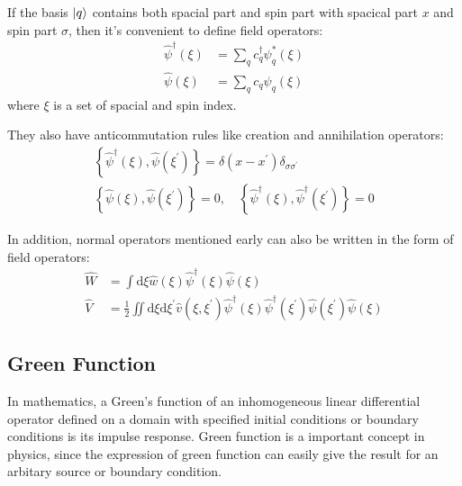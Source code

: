 If the basis $\ket{q}$ contains both spacial part and spin part with spacical part $x$ and spin part $\sigma$, then it's convenient to define field operators:
\begin{equation}
\begin{aligned} \hat{\psi}^{\dagger}(\xi) &=\sum_{q} c_{q}^{\dagger} \psi_{q}^{*}(\xi) \\ \hat{\psi}(\xi) &=\sum_{q} c_{q} \psi_{q}(\xi) \end{aligned}
\end{equation}
where $\xi$ is a set of spacial and spin index.

They also have anticommutation rules like creation and annihilation operators:
\begin{equation}
\begin{array}{c}{\left\{\hat{\psi}^{\dagger}(\xi), \hat{\psi}\left(\xi^{\prime}\right)\right\}=\delta\left(x-x^{\prime}\right) \delta_{\sigma \sigma^{\prime}}} \\ {\left\{\hat{\psi}(\xi), \hat{\psi}\left(\xi^{\prime}\right)\right\}=0, \quad\left\{\hat{\psi}^{\dagger}(\xi), \hat{\psi}^{\dagger}\left(\xi^{\prime}\right)\right\}=0}\end{array}
\end{equation}

In addition, normal operators mentioned early can also be written in the form of field operators:
\begin{equation}
\begin{aligned} \hat{W} &=\int \mathrm{d} \xi \hat{w}(\xi) \hat{\psi}^{\dagger}(\xi) \hat{\psi}(\xi) \\ \hat{V} &=\frac{1}{2} \iint \mathrm{d} \xi \mathrm{d} \xi^{\prime} \hat{v}\left(\xi, \xi^{\prime}\right) \hat{\psi}^{\dagger}(\xi) \hat{\psi}^{\dagger}\left(\xi^{\prime}\right) \hat{\psi}\left(\xi^{\prime}\right) \hat{\psi}(\xi) \end{aligned}
\end{equation}

\subsection{Green Function} \label{mathrefs}

In mathematics, a Green's function of an inhomogeneous linear differential operator defined on a domain with specified initial conditions or boundary conditions is its impulse response.
Green function is a important concept in physics, since the expression of green function can easily give the result for an arbitary source or boundary condition.

